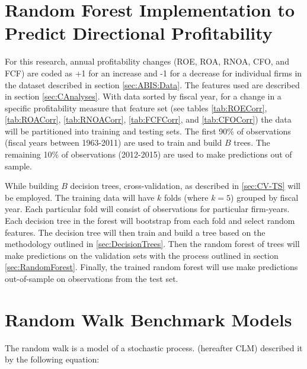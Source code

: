 
\section{Random Forest Implementation to Predict Directional Profitability}

For this research, annual profitability changes (ROE, ROA, RNOA, CFO, and FCF) are coded as +1 for an increase and -1 for a decrease for individual firms in the dataset described in section \ref{sec:ABIS:Data}. The features used are described in section \ref{sec:CAnalyses}. With data sorted by fiscal year, for a change in a specific profitability measure that feature set (see tables \ref{tab:ROECorr},  \ref{tab:ROACorr},  \ref{tab:RNOACorr},  \ref{tab:FCFCorr}, and \ref{tab:CFOCorr}) the data will be partitioned into training and testing sets. The first 90\% of observations (fiscal years between 1963-2011) are used to train and build \(B\) trees.  The remaining 10\% of observations (2012-2015) are used to make predictions out of sample. 

While building \(B\) decision trees,  cross-validation, as described in \ref{sec:CV-TS} will be employed. The training data will have \(k\) folds (where \(k=5\)) grouped by fiscal year.  Each particular fold will consist of observations for particular firm-years.  Each decision tree in the forest will bootstrap from each fold and select random features. The decision tree will then train and build a tree based on the methodology outlined in \ref{sec:DecisionTrees}. Then the random forest of trees will make predictions on the validation sets with the process outlined in section \ref{sec:RandomForest}. Finally, the trained random forest will use make predictions out-of-sample on observations from the test set.


\section{Random Walk Benchmark Models} \label{sec:RWModel}

The random walk is a model of a stochastic process.  \cite{Campbell1997} (hereafter CLM)  described it by the following equation: 

